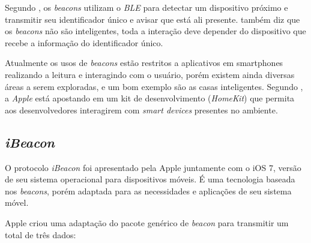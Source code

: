 \documentclass[
	12pt,				%
	openright,			%
	oneside,			%
	a4paper,			%
	chapter=TITLE,		%
	english,			%
	brazil				%
	]{abntex2}
\begin{document}
{\begin{figure}[htb]
\end{figure}

Segundo , os \textit{beacons} utilizam o \textit{BLE} para detectar um dispositivo próximo e transmitir seu identificador único e avisar que está ali presente.  também diz que os \textit{beacons} não são inteligentes, toda a interação deve depender do dispositivo que recebe a informação do identificador único.

Atualmente os usos de \textit{beacons} estão restritos a aplicativos em smartphones realizando a leitura e interagindo com o usuário, porém existem ainda diversas áreas a serem exploradas, e um bom exemplo são as casas inteligentes. Segundo , a \textit{Apple} está apostando em um kit de desenvolvimento (\textit{HomeKit}) que permita aos desenvolvedores interagirem com \textit{smart devices} presentes no ambiente.

\subsection{\textit{iBeacon}}

O protocolo \textit{iBeacon} foi apresentado pela Apple juntamente com o iOS 7, versão de seu sistema operacional para dispositivos móveis. É uma tecnologia baseada nos \textit{beacons}, porém adaptada para as necessidades e aplicações de seu sistema móvel.

Apple criou uma adaptação do pacote genérico de \textit{beacon} para transmitir um total de três dados:

}
\end{document}
